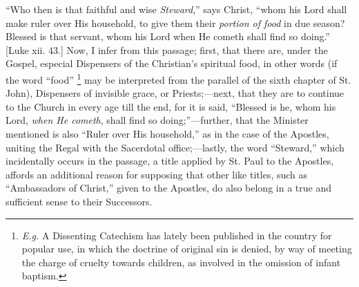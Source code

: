 ``Who then is that faithful and wise \emph{Steward},'' says
Christ, ``whom his Lord shall make ruler over His household, to give
them their \emph{portion of food} in due season? Blessed is that
servant, whom his Lord when He cometh shall find so doing.'' [Luke
xii. 43.] Now, I infer from this passage; first, that there are, under
the Gospel, especial Dispensers of the Christian's spiritual food, in
other words (if the word ``food'' \footnote{\emph{E.g.} A Dissenting
Catechism has lately been published in the country for popular use, in
which the doctrine of original sin is denied, by way of meeting the
charge of cruelty towards children, as involved in the omission of
infant baptism.} may be interpreted
from the parallel of the sixth chapter of St. John), Dispensers of
invisible grace, or Priests;—next, that they are to continue to the
Church in every age till the end, for it is said, ``Blessed is he,
whom his Lord, \emph{when He cometh}, shall find so doing;''—further,
that the Minister mentioned is also ``Ruler over His
household,'' as in the case of the Apostles, uniting the Regal with
the Sacerdotal office;—lastly, the word ``Steward,'' which
incidentally occurs in the passage, a title applied by St. Paul to the
Apostles, affords an additional reason for supposing that other like
titles, such as ``Ambassadors of Christ,'' given to the
Apostles, do also belong in a true and sufficient sense to their
Successors.


